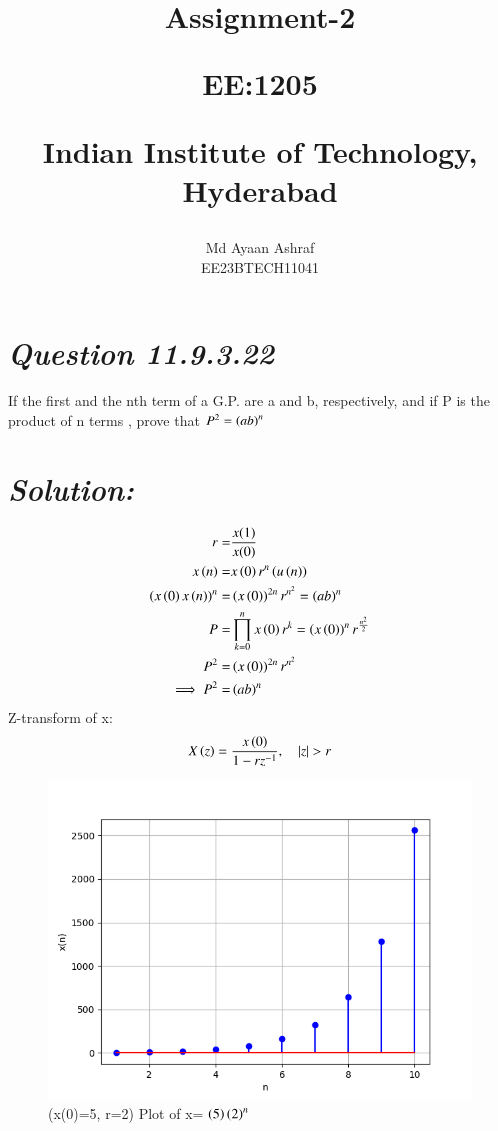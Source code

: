 \documentclass[journal,12pt,twocolumn]{IEEEtran}
\theoremstyle{remark}
\begin{document}
%




\vspace{3cm}

\title{
Assignment-2

\large{EE:1205 }

Indian Institute of Technology, Hyderabad
}
\author{Md Ayaan Ashraf

EE23BTECH11041
}  
\maketitle
\newpage
\bigskip
\renewcommand{\thefigure}{\theenumi}
\renewcommand{\thetable}{\theenumi}
\section*{\textit{\textbf{Question 11.9.3.22}}}
 If the first and the nth term of a G.P. are a and b, respectively, and if P is the product of n terms , prove that $ P^2 = \left(ab\right)^n $
\section*{\textit{\textbf{Solution:}}}

\begin{align}
r=& \frac{x(1)}{x(0)}\\
x\left(n\right) = & x\left(0\right)r^{n} \left(u\left(n\right)\right)\\
\left(x\left(0\right)x\left(n\right)\right)^n = & \left(x\left(0\right)\right)^{2n} r^{n^2}= \left(ab\right)^n\\
P =& \prod_{k=0}^{n} x\left(0\right)r^{k}= \left(x\left(0\right)\right)^n r^{\frac{n^2}{2}}\\
P^2 =& \left(x\left(0\right)\right)^{2n} r^{n^2}\\
\implies  P^2 =& \left(ab\right)^n \\
\end {align}
Z-transform of x:
\begin{align}
X\brak{z}= \frac{x\brak{0}}{1-rz^{-1}} , \quad{|z|>r}
\end{align}
\begin{figure}[ht]
    \centering
    \includegraphics[width=\columnwidth]{figs/fig.png}
    \caption{(x(0)=5, r=2) Plot of x= $\left(5\right)\left(2\right)^n$}
    \label{fig: 11.9.3.22}
\end{figure}
\end{document}
